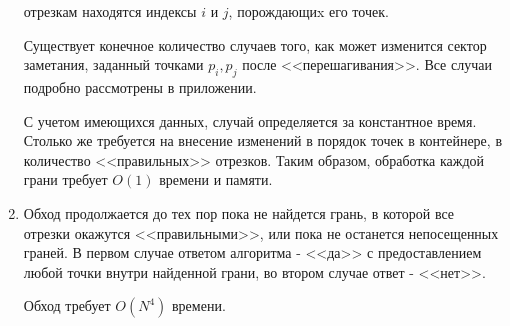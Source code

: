 \documentclass[letterpaper,12pt]{article}
\begin{document}
\begin{enumerate}
            отрезкам находятся индексы $i$ и $j$, порождающиx его точек. 
            \par
            Существует конечное количество случаев того, как может изменится
            сектор заметания, заданный точками $p_i, p_j$ после <<перешагивания>>.
            Все случаи подробно рассмотрены в приложении.
            \par
            С учетом имеющихся данных, случай определяется за 
            константное время. Столько же требуется на внесение изменений 
            в порядок точек в контейнере, в количество <<правильных>>
            отрезков.       
            Таким образом, обработка каждой грани требует $O(1)$ времени и памяти. 
      \item Обход продолжается до тех пор пока не найдется грань, 
            в которой все отрезки окажутся <<правильными>>, или пока не
            останется непосещенных граней. В первом случае ответом 
            алгоритма - <<да>> с предоставлением любой точки внутри 
            найденной грани, во втором случае ответ - <<нет>>.
            \par
            Обход требует $O(N^4)$ времени.
\end{enumerate}
\end{document}

